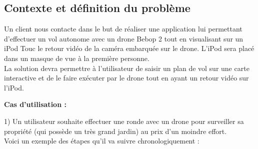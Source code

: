 \documentclass{article}
\begin{document}
	\subsection{Contexte et définition du problème}
		Un client nous contacte dans le but de réaliser une application lui permettant d'effectuer un vol autonome avec un drone Bebop 2 tout en visualisant sur un iPod Touc le retour vidéo de la caméra embarquée sur le drone. L'iPod sera placé dans un masque de vue à la première personne. \\	
		La solution devra permettre à l'utilisateur de saisir un plan de vol sur une carte interactive et de le faire exécuter par le drone tout en ayant un retour vidéo sur l'iPod.\\
		\medbreak
        \begin{flushleft}
	    \textbf{Cas d'utilisation :} \\
	    \end{flushleft}
	    \begin{flushleft}
	    1) Un utilisateur souhaite effectuer une ronde avec un drone pour surveiller sa propriété (qui possède un très grand jardin) au prix d'un moindre effort.\\
	    Voici un exemple des étapes qu'il va suivre chronologiquement :\\
		[1cm]	     
	    \end{flushleft}
\end{document}
